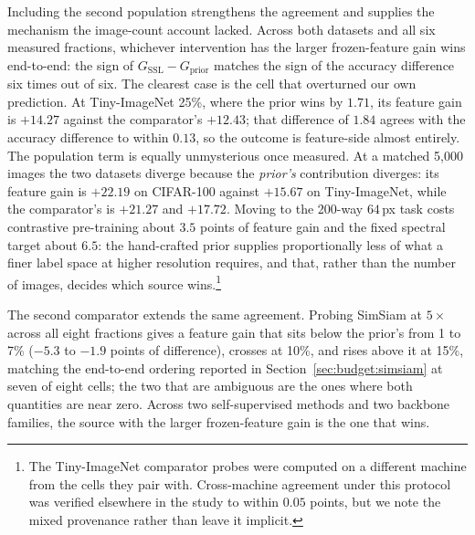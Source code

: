 Including the second population strengthens the agreement and supplies the
mechanism the image-count account lacked. Across both datasets and all six
measured fractions, whichever intervention has the larger frozen-feature gain
wins end-to-end: the sign of $G_{\mathrm{SSL}} - G_{\mathrm{prior}}$ matches
the sign of the accuracy difference six times out of six. The clearest case is
the cell that overturned our own prediction. At Tiny-ImageNet 25\%, where the
prior wins by $1.71$, its feature gain is $+14.27$ against the comparator's
$+12.43$; that difference of $1.84$ agrees with the accuracy difference to
within $0.13$, so the outcome is feature-side almost entirely. The population
term is equally unmysterious once measured. At a matched 5{,}000 images the
two datasets diverge because the \emph{prior's} contribution diverges: its
feature gain is $+22.19$ on CIFAR-100 against $+15.67$ on Tiny-ImageNet, while
the comparator's is $+21.27$ and $+17.72$. Moving to the 200-way $64$\,px task
costs contrastive pre-training about $3.5$ points of feature gain and the
fixed spectral target about $6.5$: the hand-crafted prior supplies
proportionally less of what a finer label space at higher resolution requires,
and that, rather than the number of images, decides which source wins.\footnote{The Tiny-ImageNet comparator probes were computed on a
different machine from the cells they pair with. Cross-machine agreement
under this protocol was verified elsewhere in the study to within $0.05$
points, but we note the mixed provenance rather than leave it implicit.}

The second comparator extends the same agreement. Probing SimSiam at
$5\times$ across all eight fractions gives a feature gain that sits below
the prior's from 1 to 7\% ($-5.3$ to $-1.9$ points of difference), crosses
at 10\%, and rises above it at 15\%, matching the end-to-end ordering
reported in Section~\ref{sec:budget:simsiam} at seven of eight cells; the
two that are ambiguous are the ones where both quantities are near zero.
Across two self-supervised methods and two backbone families, the source
with the larger frozen-feature gain is the one that wins.

